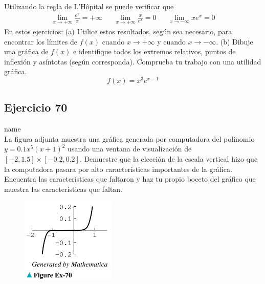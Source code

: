 \documentclass[12pt]{article}
\begin{document}
Utilizando la regla de L'Hôpital se puede verificar que
\begin{align*}
  \lim_{x \to +\infty} \frac{e^x}{x}=+\infty && \lim_{x \to +\infty} \frac{x}{e^x}=0 && \lim_{x \to -\infty} xe^x=0
\end{align*}
En estos ejercicios: (a) Utilice estos resultados, según sea necesario, para encontrar los límites de $f(x)$ cuando $x\rightarrow +\infty$ y cuando $x\rightarrow -\infty$. (b) Dibuje una gráfica de $f(x)$ e identifique todos los extremos relativos, puntos de inflexión y asíntotas (según corresponda). Comprueba tu trabajo con una utilidad gráfica.
\[
f(x)=x^3e^{x-1}
\]

\subsection{Ejercicio 70} name \\

La figura adjunta muestra una gráfica generada por computadora del polinomio $y = 0.1x^5 (x + 1)^2$ usando una ventana de visualización de $[−2, 1.5] \times [−0.2, 0.2]$. Demuestre que la elección de la escala vertical hizo que la computadora pasara por alto características importantes de la gráfica. Encuentra las características que faltaron y haz tu propio boceto del gráfico que muestra las características que faltan.
\begin{figure}[H]
\centering
\includegraphics[width=0.4\textwidth]{../img/img_Lista3/2_70.png}
\end{figure}
\end{document}
